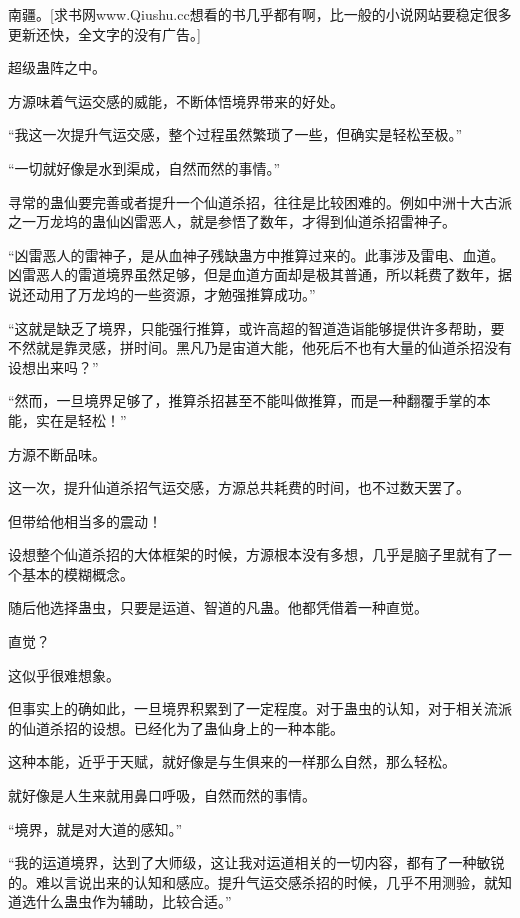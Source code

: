 
\begin{this_body}

南疆。[求书网www.Qiushu.cc想看的书几乎都有啊，比一般的小说网站要稳定很多更新还快，全文字的没有广告。]

超级蛊阵之中。

方源味着气运交感的威能，不断体悟境界带来的好处。

“我这一次提升气运交感，整个过程虽然繁琐了一些，但确实是轻松至极。”

“一切就好像是水到渠成，自然而然的事情。”

寻常的蛊仙要完善或者提升一个仙道杀招，往往是比较困难的。例如中洲十大古派之一万龙坞的蛊仙凶雷恶人，就是参悟了数年，才得到仙道杀招雷神子。

“凶雷恶人的雷神子，是从血神子残缺蛊方中推算过来的。此事涉及雷电、血道。凶雷恶人的雷道境界虽然足够，但是血道方面却是极其普通，所以耗费了数年，据说还动用了万龙坞的一些资源，才勉强推算成功。”

“这就是缺乏了境界，只能强行推算，或许高超的智道造诣能够提供许多帮助，要不然就是靠灵感，拼时间。黑凡乃是宙道大能，他死后不也有大量的仙道杀招没有设想出来吗？”

“然而，一旦境界足够了，推算杀招甚至不能叫做推算，而是一种翻覆手掌的本能，实在是轻松！”

方源不断品味。

这一次，提升仙道杀招气运交感，方源总共耗费的时间，也不过数天罢了。

但带给他相当多的震动！

设想整个仙道杀招的大体框架的时候，方源根本没有多想，几乎是脑子里就有了一个基本的模糊概念。

随后他选择蛊虫，只要是运道、智道的凡蛊。他都凭借着一种直觉。

直觉？

这似乎很难想象。

但事实上的确如此，一旦境界积累到了一定程度。对于蛊虫的认知，对于相关流派的仙道杀招的设想。已经化为了蛊仙身上的一种本能。

这种本能，近乎于天赋，就好像是与生俱来的一样那么自然，那么轻松。

就好像是人生来就用鼻口呼吸，自然而然的事情。

“境界，就是对大道的感知。”

“我的运道境界，达到了大师级，这让我对运道相关的一切内容，都有了一种敏锐的。难以言说出来的认知和感应。提升气运交感杀招的时候，几乎不用测验，就知道选什么蛊虫作为辅助，比较合适。”


\end{this_body}
